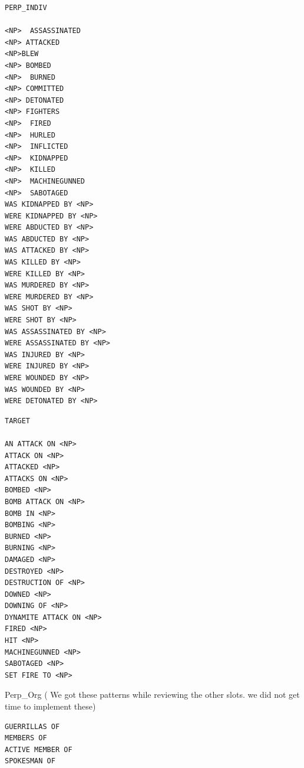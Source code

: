 \documentclass[11pt]{myclass}
\begin{document}
\begin{verbatim}
PERP_INDIV

<NP>  ASSASSINATED
<NP> ATTACKED
<NP>BLEW
<NP> BOMBED
<NP>  BURNED
<NP> COMMITTED
<NP> DETONATED
<NP> FIGHTERS
<NP>  FIRED
<NP>  HURLED
<NP>  INFLICTED
<NP>  KIDNAPPED
<NP>  KILLED
<NP>  MACHINEGUNNED
<NP>  SABOTAGED
WAS KIDNAPPED BY <NP>
WERE KIDNAPPED BY <NP>
WERE ABDUCTED BY <NP>
WAS ABDUCTED BY <NP>
WAS ATTACKED BY <NP>
WAS KILLED BY <NP>
WERE KILLED BY <NP>
WAS MURDERED BY <NP>
WERE MURDERED BY <NP>
WAS SHOT BY <NP>
WERE SHOT BY <NP>
WAS ASSASSINATED BY <NP>
WERE ASSASSINATED BY <NP>
WAS INJURED BY <NP>
WERE INJURED BY <NP>
WERE WOUNDED BY <NP>
WAS WOUNDED BY <NP>
WERE DETONATED BY <NP>
\end{verbatim}

\begin{verbatim}
TARGET

AN ATTACK ON <NP>
ATTACK ON <NP>
ATTACKED <NP>
ATTACKS ON <NP>
BOMBED <NP>
BOMB ATTACK ON <NP>
BOMB IN <NP>
BOMBING <NP>
BURNED <NP>
BURNING <NP>
DAMAGED <NP>
DESTROYED <NP>
DESTRUCTION OF <NP>
DOWNED <NP>
DOWNING OF <NP>
DYNAMITE ATTACK ON <NP>
FIRED <NP>
HIT <NP>
MACHINEGUNNED <NP>
SABOTAGED <NP>
SET FIRE TO <NP>
\end{verbatim}



Perp\_Org   ( We got these patterns while reviewing the other slots. we did not get time to implement these)

\begin{verbatim}
GUERRILLAS OF
MEMBERS OF
ACTIVE MEMBER OF
SPOKESMAN OF 	
\end{verbatim}
\end{document}
